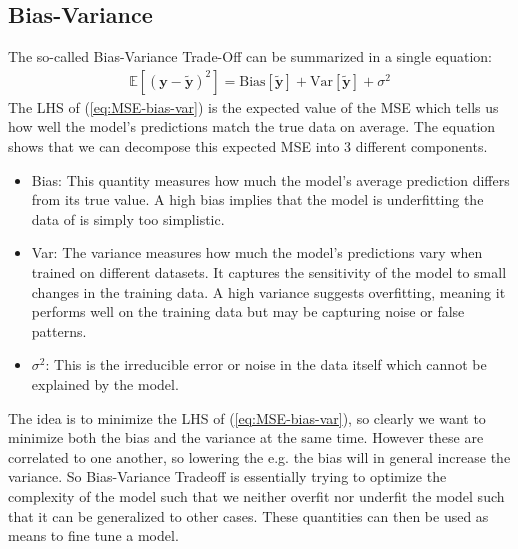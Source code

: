 \documentclass[%
reprint,
amsmath,amssymb,
aps,
pra,
]{revtex4-2}
\begin{document}
\subsection{Bias-Variance}
The so-called Bias-Variance Trade-Off can be summarized in a single equation:
\begin{align}
	\mathbb{E}[(\bm y-\tilde{\bm y})^2]=\text{Bias}[\tilde{\bm y}]+\text{Var}[\tilde{\bm y}]+\sigma^2
	\label{eq:MSE-bias-var}
\end{align}
The LHS of (\ref{eq:MSE-bias-var}) is the expected value of the MSE which tells us how well the model's predictions match the true data on average. The equation shows that we can decompose this expected MSE into 3 different components.
\begin{itemize}
	\item Bias: This quantity measures how much the model's average prediction differs from its true value. A high bias implies that the model is underfitting the data of is simply too simplistic.
	\item Var: The variance measures how much the model's predictions vary when trained on different datasets. It captures the sensitivity of the model to small changes in the training data. A high variance suggests overfitting, meaning it performs well on the training data but may be capturing noise or false patterns.
	\item $\sigma^2$: This is the irreducible error or noise in the data itself which cannot be explained by the model.
\end{itemize}
The idea is to minimize the LHS of (\ref{eq:MSE-bias-var}), so clearly we want to minimize both the bias and the variance at the same time. However these are correlated to one another, so lowering the e.g. the bias will in general increase the variance. So Bias-Variance Tradeoff is essentially trying to optimize the complexity of the model such that we neither overfit nor underfit the model such that it can be generalized to other cases. These quantities can then be used as means to fine tune a model.
\end{document}
